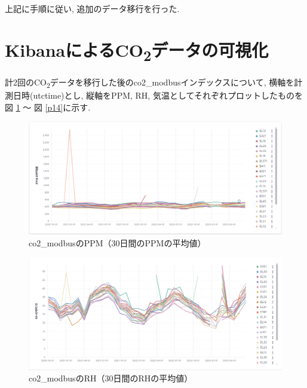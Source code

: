 上記に手順に従い, 追加のデータ移行を行った.

\section{KibanaによるCO\textsubscript{2}データの可視化}

計2回のCO\textsubscript{2}データを移行した後のco2\_modbusインデックスについて, 横軸を計測日時(utctime)とし, 縦軸をPPM, RH, 気温としてそれぞれプロットしたものを図 \ref{p12} 〜 図 \ref{p14}に示す.

\begin{figure}[H]
  \hspace*{-2cm} %
  \centering %
  \includegraphics[width=170mm]{sotu/figure/ppm.png}
  \caption{co2\_modbusのPPM（30日間のPPMの平均値）}
  \label{p12}
\end{figure}

\begin{figure}[H]
  \hspace*{-2cm} %
  \centering %
  \includegraphics[width=170mm]{sotu/figure/rh.png}
  \caption{co2\_modbusのRH（30日間のRHの平均値）}
  \label{p13}
\end{figure}

